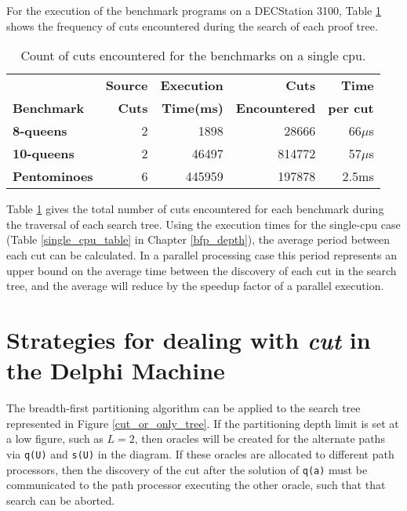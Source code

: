 For the execution of the benchmark programs on a DECStation 3100, Table \ref{cut_counts}
shows the frequency of cuts encountered during the search of each proof tree.

\begin{table}[htbp]
{\small
\begin{tabular}{| l | r | r | r | r |}
\hline
                   & \textbf{Source} & \textbf{Execution} & \textbf{Cuts}        & \textbf{Time}\\
\textbf{Benchmark} & \textbf{Cuts}   & \textbf{Time(ms)}  & \textbf{Encountered} & \textbf{per cut} \\
\hline
\textbf{8-queens}    & 2 &   1898 &  28666 & 66$\mu$s \\
\hline
\textbf{10-queens}   & 2 &  46497 & 814772 & 57$\mu$s \\
\hline
\textbf{Pentominoes} & 6 & 445959 & 197878 & 2.5ms    \\
\hline
\end{tabular}
}
\caption{Count of cuts encountered for the benchmarks on a single cpu.}
\label{cut_counts}
\end{table}

Table \ref{cut_counts} gives the total number of cuts encountered for each benchmark during
the traversal of each search tree.  Using the execution times for the single-cpu case
(Table \ref{single_cpu_table} in Chapter \ref{bfp_depth}), the average period between
each cut can be calculated.  In a parallel processing case this period represents an
upper bound on the average time between the discovery of each cut in the search tree,
and the average will reduce by the speedup factor of a parallel execution.

\section[Strategies for dealing with \textit{cut}]{Strategies for dealing with \textit{cut} in the Delphi Machine} %
\enlargethispage{2\baselineskip} %

The breadth-first partitioning algorithm can be applied to the 
search tree represented in Figure \ref{cut_or_only_tree}.  If the 
partitioning depth limit
is set at a low figure, such as $L=2$, then oracles will be created for the
alternate paths via \texttt{q(U)} and \texttt{s(U)} in the diagram.  If these
oracles are allocated to different path processors, then the discovery of the
cut after the solution of \texttt{q(a)} must be communicated to the path
processor executing the other oracle, such that that search can be aborted.

